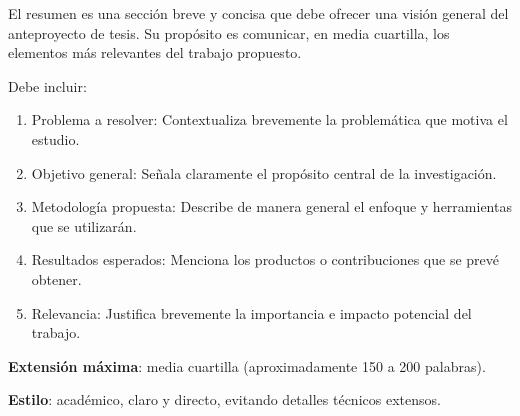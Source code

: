 El resumen es una sección breve y concisa que debe ofrecer una visión general del anteproyecto de tesis. Su propósito es comunicar, en media cuartilla, los elementos más relevantes del trabajo propuesto.

Debe incluir:

\begin{enumerate}
    \item Problema a resolver: Contextualiza brevemente la problemática que motiva el estudio.
    \item Objetivo general: Señala claramente el propósito central de la investigación.
    \item Metodología propuesta: Describe de manera general el enfoque y herramientas que se utilizarán.
    \item Resultados esperados: Menciona los productos o contribuciones que se prevé obtener.
    \item Relevancia: Justifica brevemente la importancia e impacto potencial del trabajo.
\end{enumerate}

\textbf{Extensión máxima}: media cuartilla (aproximadamente 150 a 200 palabras).

\textbf{Estilo}: académico, claro y directo, evitando detalles técnicos extensos.